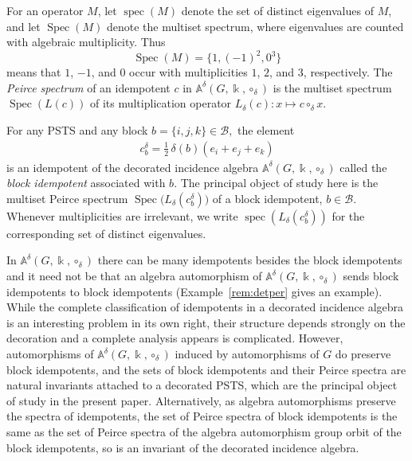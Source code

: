\documentclass[times,11pt,reqno]{amsproc}
\theoremstyle{definition}
\numberwithin{equation}{section}
\newcommand\fie{\Bbbk}
\def\alg{\mathbb{A}}
\DeclareMathOperator{\spec}{spec}
\DeclareMathOperator{\Spec}{Spec}
\begin{document}
For an operator $M$, let
$\spec(M)$ denote the set of distinct eigenvalues of $M$, and let
$\Spec(M)$ denote the multiset spectrum, where eigenvalues are counted
with algebraic multiplicity. Thus
$$
\Spec(M)=\{1,(-1)^2,0^3\}
$$
means that $1$, $-1$, and $0$ occur with multiplicities $1$, $2$, and
$3$, respectively.
The \emph{Peirce spectrum} of an idempotent $c$ in $\alg^\delta(G,\fie,\circ_\delta)$ is the multiset spectrum $\Spec(L(c))$ of its multiplication operator $L_{\delta}(c):x\mapsto c\circ_\delta x$.

For any PSTS and any block
$
b=\{i,j,k\}\in\mathcal B,
$
the element
\begin{align}\label{blockidempotent}
c_b^\delta
=
\frac12\,\delta(b)(e_i+e_j+e_k)
\end{align}
is an idempotent of the decorated incidence algebra $\alg^\delta(G,\fie,\circ_\delta)$ called the \emph{block idempotent} associated with $b$. The principal object of study here is the multiset Peirce spectrum
$
\Spec\bigl(L_\delta(c_b^\delta)\bigr)
$
of a block idempotent, $b\in\mathcal B$.
Whenever multiplicities are irrelevant, we write $\spec(L_\delta(c_b^\delta))$ for the corresponding set of distinct
eigenvalues.




In $\alg^\delta(G,\fie,\circ_\delta)$ there can be many idempotents besides the block idempotents and it need not be that an algebra automorphism of $\alg^\delta(G,\fie,\circ_\delta)$ sends block idempotents to block idempotents (Example~\ref{rem:detper} gives an example). While the complete classification of idempotents in a decorated incidence algebra is an interesting problem in its own right, their structure depends strongly on the decoration and a complete analysis appears is complicated. However, automorphisms of $\alg^\delta(G,\fie,\circ_\delta)$ induced by automorphisms of $G$ do preserve block idempotents, and the sets of block idempotents and their Peirce spectra are natural invariants attached to a decorated PSTS, which are the principal object of study in the present paper. Alternatively, as algebra automorphisms preserve the spectra of idempotents, the set of Peirce spectra of block idempotents is the same as the set of Peirce spectra of the algebra automorphism group orbit of the block idempotents, so is an invariant of the decorated incidence algebra.
\end{document}
